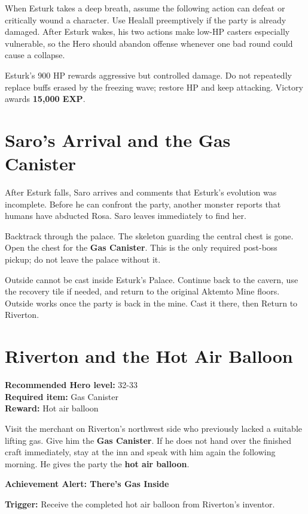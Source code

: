 \documentclass[
  american,
  10pt,
  letterpaper,
  oneside,
  open=any]{scrreprt}
\begin{document}
When Esturk takes a deep breath, assume the following action can defeat
or critically wound a character. Use Healall preemptively if the party
is already damaged. After Esturk wakes, his two actions make low-HP
casters especially vulnerable, so the Hero should abandon offense
whenever one bad round could cause a collapse.

Esturk's 900 HP rewards aggressive but controlled damage. Do not
repeatedly replace buffs erased by the freezing wave; restore HP and
keep attacking. Victory awards \textbf{15,000 EXP}.

\section{Saro's Arrival and the Gas
Canister}\label{saros-arrival-and-the-gas-canister}

After Esturk falls, Saro arrives and comments that Esturk's evolution
was incomplete. Before he can confront the party, another monster
reports that humans have abducted Rosa. Saro leaves immediately to find
her.

Backtrack through the palace. The skeleton guarding the central chest is
gone. Open the chest for the \textbf{Gas Canister}. This is the only
required post-boss pickup; do not leave the palace without it.

Outside cannot be cast inside Esturk's Palace. Continue back to the
cavern, use the recovery tile if needed, and return to the original
Aktemto Mine floors. Outside works once the party is back in the mine.
Cast it there, then Return to Riverton.

\section{Riverton and the Hot Air
Balloon}\label{riverton-and-the-hot-air-balloon}

\textbf{Recommended Hero level:} 32-33\\
\textbf{Required item:} Gas Canister\\
\textbf{Reward:} Hot air balloon

Visit the merchant on Riverton's northwest side who previously lacked a
suitable lifting gas. Give him the \textbf{Gas Canister}. If he does not
hand over the finished craft immediately, stay at the inn and speak with
him again the following morning. He gives the party the \textbf{hot air
balloon}.

\begin{achievementalert}

\textbf{Achievement Alert: There's Gas Inside}

\textbf{Trigger:} Receive the completed hot air balloon from Riverton's
inventor.

\end{achievementalert}
\end{document}
